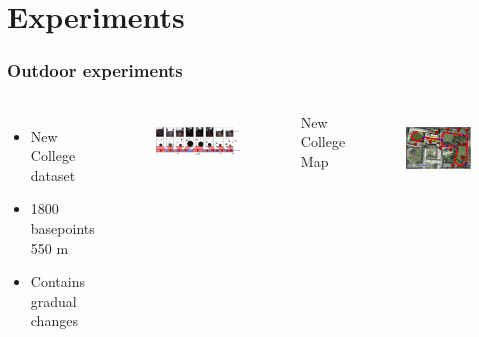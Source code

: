 \section{Experiments}


\frame
{
	\frametitle{Outdoor experiments}
		
	\begin{columns}[T]
		\begin{itemize}
			\item New College dataset
			\item 1800 basepoints 550 m
			\item Contains gradual changes
		\end{itemize}
		\centering
		\begin{figure}[p]
			\hspace{0.5cm}
			\includegraphics[width = 1\textwidth]{img/icsc/detected_places_nc}
			\label{fig:nc_ssg}
		\end{figure}

		\centering New College Map
		\begin{figure}[p]
			\centering
			\hspace{0.5cm}
			\includegraphics[width = 1.0\textwidth]{img/icsc/detected_places_nc_map}
			\label{fig:nc_map}
		\end{figure}
		

	\end{columns}		
	
}
